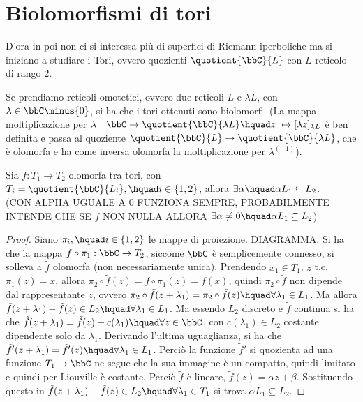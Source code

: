 \section{Biolomorfismi di tori}
D'ora in poi non ci si interessa più di superfici di Riemann iperboliche ma si iniziano a studiare i Tori, ovvero quozienti $\quotient{\bbC}{L}$ con $L$ reticolo di rango $2$.


\begin{osservazione}
Se prendiamo reticoli omotetici, ovvero due reticoli $L$ e $\lambda L$, con $\lambda \in \bbC\minus\{ 0\}$, si ha che i tori ottenuti sono biolomorfi. (La mappa moltiplicazione per $\lambda \quad \bbC \rightarrow \quotient{\bbC}{\lambda L} \hquad z\ \mapsto [\lambda z]_{\lambda L} $ è ben definita e passa al quoziente $\quotient{\bbC}{L}\rightarrow \quotient{\bbC}{\lambda L}$, che è olomorfa e ha come inversa olomorfa la moltiplicazione per $\lambda^{(-1)}$).
\end{osservazione}

\begin{fatto}Sia $f:T_1\rightarrow T_2$ olomorfa tra tori, con $T_i=\quotient{\bbC}{L_i},\hquad i\in \{ 1,2\}$, allora $\exists\alpha \hquad \alpha L_1\subseteq L_2$.\\
(CON ALPHA UGUALE A $0$ FUNZIONA SEMPRE, PROBABILMENTE INTENDE CHE SE $f$ NON NULLA ALLORA $\exists \alpha \ne 0 \hquad \alpha L_1\subseteq L_2$)
\end{fatto}
\begin{proof} Siano $\pi_i,\hquad i\in \{ 1,2\}$ le mappe di proiezione. DIAGRAMMA.
Si ha che la mappa $f\circ\pi_1: \bbC\rightarrow T_2$, siccome $\bbC$ è semplicemente connesso, si solleva a $\tilde{f}$ olomorfa (non necessariamente unica).
Prendendo $x_1\in T_1$, $z$ t.c. $\pi_1(z)=x$, allora $\pi_2\circ\tilde{f} (z) = f\circ \pi_1 (z)= f(x)$, quindi $\pi_2\circ \tilde{f}$ non dipende dal rappresentante $z$, ovvero $\pi_2\circ \tilde{f} (z+\lambda_1)=\pi_2\circ \tilde{f} (z)\hquad \forall \lambda_1\in L_1$.
Ma allora $\tilde{f} (z+\lambda_1) - \tilde{f} (z) \in L_2 \hquad \forall \lambda_1 \in L_1$.
Ma essendo $L_2$ discreto e $\tilde{f}$ continua si ha che $\tilde{f}(z+\lambda_1)=\tilde{f}(z)+c(\lambda_1)\hquad \forall z\in\bbC$, con $c(\lambda_1)\in L_2$ costante dipendente solo da $\lambda_1$.
Derivando l'ultima uguaglianza, si ha che $\tilde{f}'(z+\lambda_1)=\tilde{f}'(z) \hquad\forall \lambda_1\in L_1$.
Perciò la funzione $\tilde{f}'$ si quozienta ad una funzione  $T_1\rightarrow \bbC$ ne segue che la sua immagine è un compatto, quindi limitato e quindi per Liouville è costante. 
Perciò $\tilde{f}$ è lineare, $\tilde{f}(z)=\alpha z+\beta$.
Sostituendo questo in $\tilde{f} (z+\lambda_1) - \tilde{f} (z) \in L_2 \hquad \forall \lambda_1 \in T_1$ si trova $\alpha L_1\subseteq L_2$.
\end{proof}

